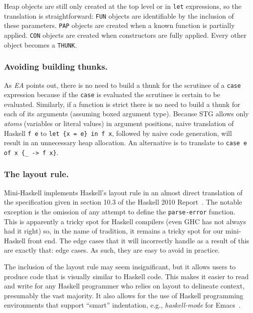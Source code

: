 \documentclass{llncs}
\begin{document}
Heap objects are still only created at the top level or in \texttt{let}
expressions, so the translation is straightforward: \texttt{FUN} objects are
identifiable by the inclusion of these parameters.  \texttt{PAP} objects are
created when a known function is partially applied.  \texttt{CON} objects are
created when constructors are fully applied.  Every other object becomes a
\texttt{THUNK}.

\subsubsection{Avoiding building thunks.}
As \emph{EA} points out, there is no need to build a thunk for the scrutinee
of a \texttt{case} expression because if the \texttt{case} is evaluated the
scrutinee is certain to be evaluated.  Similarly, if a function is strict
there is no need to build a thunk for each of its arguments (assuming boxed
argument type).  Because STG allows only \emph{atoms} (variables or literal
values) in argument positions, naive translation of Haskell \texttt{f e} to
\texttt{let \{x = e\} in f x}, followed by naive code generation, will result in
an unnecessary heap allocation.  An alternative is to translate to
\texttt{case e of x \{\_ -> f x\}}.

\subsubsection{The layout rule.}
Mini-Haskell implements Haskell's layout rule in an almost direct translation
of the specification given in section 10.3 of the Haskell 2010
Report~\cite{haskell2010report}. The notable exception is the omission of any
attempt to define the \texttt{parse-error} function.  This is apparently a
tricky spot for Haskell compilers (even GHC has not always had it right) so,
in the name of tradition, it remains a tricky spot for our mini-Haskell front
end.  The edge cases that it will incorrectly handle as a result of this are
exactly that: edge cases.  As such, they are easy to avoid in practice.

The inclusion of the layout rule may seem insignificant, but it
allows users to produce code that is visually similar to Haskell code.
This makes it easier to read and write for any Haskell programmer who relies
on layout to delineate context, presumably the vast majority.  It also allows
for the use of Haskell programming environments that support ``smart''
indentation, e.g., \emph{haskell-mode} for Emacs~\cite{haskellmode}.
\end{document}
